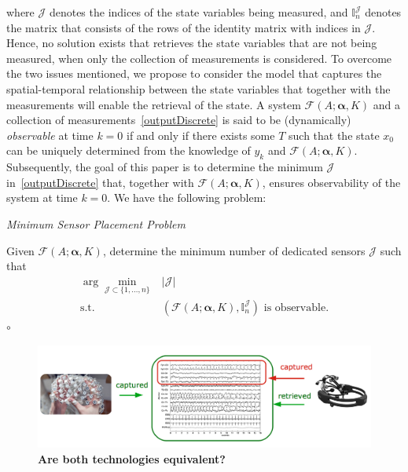where $\mathcal J$ denotes the indices of the state  variables being measured, and $\mathbb{I}^{\mathcal J}_{n}$ denotes the matrix that consists of the rows of the identity matrix with indices in $\mathcal J$. Hence, no solution exists that retrieves the state variables that are not being measured, when only the collection of measurements is considered.  To overcome the two issues mentioned, we propose to  consider the model that captures the spatial-temporal relationship between the state variables that together with the measurements will enable the retrieval of the state. A system $\mathcal F(A;\boldsymbol{\alpha},K)$ and a collection of measurements~\eqref{outputDiscrete} is said to be (dynamically) \emph{observable} at time $k=0$ if and only if there exists some $T$ such that the state $x_0$ can be uniquely determined from the knowledge of $y_k$ and $\mathcal F(A;\boldsymbol{\alpha},K)$. Subsequently, the goal of this paper is to determine the minimum $\mathcal J$ in~\eqref{outputDiscrete} that, together with $\mathcal F(A;\boldsymbol{\alpha},K)$, ensures observability of the system at time $k=0$. We have the following problem:

  

\textit{Minimum Sensor Placement Problem}


Given $\mathcal F(A;\boldsymbol{\alpha},K)$,  determine the minimum number of dedicated sensors $\mathcal J$  such that
\begin{equation}
\begin{array}{cc}
\arg\min\limits_{\mathcal J\subset \{1,\ldots,n\}} & |\mathcal J|\\
\text{s.t.} & (\mathcal F(A;\boldsymbol{\alpha},K),\mathbb{I}_n^{\mathcal J}) \text{ is observable.}
\end{array}
\label{optProbP2}
\end{equation}
\hfill $\circ$

\begin{figure}[htb]
\centering
\includegraphics[width=1\columnwidth]{eegCapRec.png}
\caption{\textbf{Are both technologies equivalent?}}\label{fig:EEGCapRec}
\end{figure}

